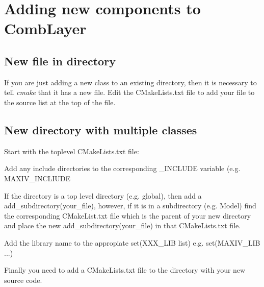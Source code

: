 
\section{Adding new components to CombLayer}

\subsection{New file in directory}

If you are just adding a new class to an existing directory, then it
is necessary to tell {\it cmake} that it has a new file. Edit the
CMakeLists.txt file to add your file to the source list at the top of the file.

\subsection{New directory with multiple classes}

Start with the toplevel CMakeLists.txt file:

Add any include directories to the corresponding \_INCLUDE variable (e.g.
MAXIV\_INCLIUDE

If the directory is a top level directory (e.g. global), then add a
add_subdirectory(your_file), however, if it is in a subdirectory (e.g. Model)
find the corresponding CMakeList.txt file which is the parent of your new directory and place the new add_subdirectory(your_file) in that CMakeLists.txt file.

Add the library name to the appropiate set(XXX\_LIB list) e.g.
set(MAXIV\_LIB ...)

Finally you need to add a CMakeLists.txt file to the directory with
your new source code.

